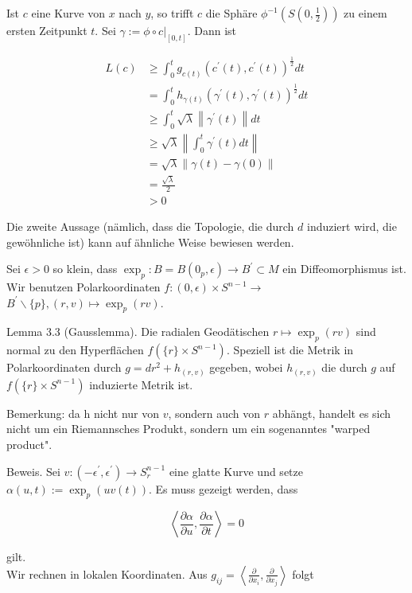 \documentclass[10pt, letterpaper]{article}
\begin{document}
Ist $c$ eine Kurve von $x$ nach $y$, so trifft $c$ die Sphäre $\phi^{-1}\left(S\left(0, \frac{1}{2}\right)\right)$ zu einem ersten Zeitpunkt $t$. Sei $\gamma:=\left.\phi \circ c\right|_{[0, t]}$. Dann ist

$$
\begin{aligned}
L(c) & \geq \int_{0}^{t} g_{c(t)}\left(c^{\prime}(t), c^{\prime}(t)\right)^{\frac{1}{2}} d t \\
& =\int_{0}^{t} h_{\gamma(t)}\left(\gamma^{\prime}(t), \gamma^{\prime}(t)\right)^{\frac{1}{2}} d t \\
& \geq \int_{0}^{t} \sqrt{\lambda}\left\|\gamma^{\prime}(t)\right\| d t \\
& \geq \sqrt{\lambda}\left\|\int_{0}^{t} \gamma^{\prime}(t) d t\right\| \\
& =\sqrt{\lambda}\|\gamma(t)-\gamma(0)\| \\
& =\frac{\sqrt{\lambda}}{2} \\
& >0
\end{aligned}
$$

Die zweite Aussage (nämlich, dass die Topologie, die durch $d$ induziert wird, die gewöhnliche ist) kann auf ähnliche Weise bewiesen werden.

Sei $\epsilon>0$ so klein, dass $\exp _{p}: B=B\left(0_{p}, \epsilon\right) \rightarrow B^{\prime} \subset M$ ein Diffeomorphismus ist. Wir benutzen Polarkoordinaten $f:(0, \epsilon) \times S^{n-1} \rightarrow$ $B^{\prime} \backslash\{p\},(r, v) \mapsto \exp _{p}(r v)$.

Lemma 3.3 (Gausslemma). Die radialen Geodätischen $r \mapsto \exp _{p}(r v)$ sind normal zu den Hyperflächen $f\left(\{r\} \times S^{n-1}\right)$. Speziell ist die Metrik in Polarkoordinaten durch $g=d r^{2}+h_{(r, v)}$ gegeben, wobei $h_{(r, v)}$ die durch $g$ auf $f\left(\{r\} \times S^{n-1}\right)$ induzierte Metrik ist.

Bemerkung: da h nicht nur von $v$, sondern auch von $r$ abhängt, handelt es sich nicht um ein Riemannsches Produkt, sondern um ein sogenanntes "warped product".

Beweis. Sei $v:\left(-\epsilon^{\prime}, \epsilon^{\prime}\right) \rightarrow S_{r}^{n-1}$ eine glatte Kurve und setze $\alpha(u, t):=\exp _{p}(u v(t))$. Es muss gezeigt werden, dass

$$
\left\langle\frac{\partial \alpha}{\partial u}, \frac{\partial \alpha}{\partial t}\right\rangle=0
$$

gilt.\\
Wir rechnen in lokalen Koordinaten. Aus $g_{i j}=\left\langle\frac{\partial}{\partial x_{i}}, \frac{\partial}{\partial x_{j}}\right\rangle$ folgt
\end{document}
